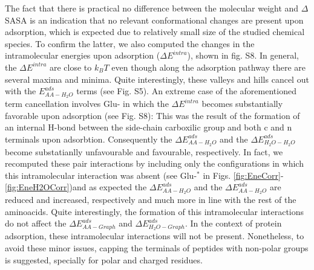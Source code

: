 \documentclass[journal=jcisd8,manuscript=article,layout=twocolumn]{achemso}
\begin{document}
The fact that there is practical no difference between the molecular weight and $\Delta$SASA is an indication that no relevant conformational changes are present upon adsorption, which is expected due to relatively small size of the studied chemical species. To confirm the latter, we also computed the changes in the intramolecular energies upon adsorption ($\Delta E^{intra}$), shown in fig. S8. In general, the $\Delta E^{intra}$ are close to $k_{B}T$ even though along the adsorption pathway there are several maxima and minima. Quite interestingly, these valleys and hills cancel out with the  $E^{ads}_{AA-H_2O}$ terms (see Fig. S5). An extreme case of the aforementioned term cancellation involves Glu- in which the $\Delta E^{intra}$ becomes substantially favorable upon adsorption (see Fig. S8):  This was the result of the formation of an internal H-bond between the side-chain carboxilic group and both c and n terminals upon adsorbtion. Consequently the $\Delta E^{ads}_{AA-H_2O}$ and the $\Delta E^{ads}_{H_2O-H_2O}$ become substatianlly unfavourable and favourable, respectively.  In fact, we recomputed these pair interactions by including only the configurations in which this intramolecular interaction was absent (see Glu-$^*$ in Figs. \ref{fig:EneCorr}-\ref{fig:EneH2OCorr})and as expected  the $\Delta E^{ads}_{AA-H_2O}$ and the $\Delta E^{ads}_{AA-H_2O}$ are reduced and increased, respectively and much more in line with the rest of the aminoacids. Quite interestingly, the formation of this intramolecular interactions do not affect the  $\Delta E^{ads}_{AA-Graph}$ and $\Delta E^{ads}_{H_2O-Graph}$.
In the context of protein adsorption, these intramolecular interactions will not be present.
Nonetheless, to avoid these minor issues, capping the terminals of peptides with non-polar groups is suggested, specially for polar and charged residues.
\end{document}
